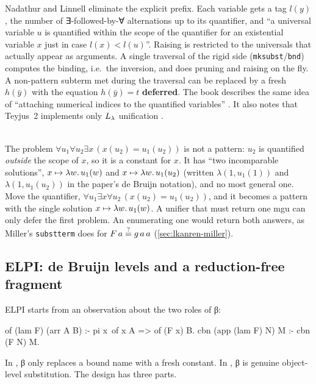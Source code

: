 Nadathur and Linnell \cite{NadathurLinnell2005} eliminate the explicit prefix. Each variable gets a
tag $l(y)$, the number of ∃-followed-by-∀ alternations up to its quantifier, and \enquote{a universal
variable $u$ is quantified within the scope of the quantifier for an existential variable $x$ just in
case $l(x)<l(u)$}. Raising is restricted to the universals that actually appear as arguments. A single
traversal of the rigid side (\texttt{mksubst}/\texttt{bnd}) computes the binding, i.e.\ the inversion,
and does pruning and raising on the fly. A non-pattern subterm met during the traversal can be replaced
by a fresh $h(\bar y)$ with the equation $h(\bar y)=t$ \textbf{deferred}. The book describes the same
idea of \enquote{attaching numerical indices to the quantified variables} . It also notes that
Teyjus~2 implements only $L_\lambda$ unification .

\begin{example}\leavevmode\\
The problem $\forall u_1\forall u_2\exists x\,(x(u_2)=u_1(u_2))$ is not a pattern: $u_2$ is quantified
\emph{outside} the scope of $x$, so it is a constant for $x$. It has \enquote{two incomparable solutions},
$x\mapsto\lambda w.\,u_1(w)$ and $x\mapsto\lambda w.\,u_1(u_2)$ (written $\lambda(1,u_1(1))$ and
$\lambda(1,u_1(u_2))$ in the paper's de Bruijn notation), and no most general one. Move the quantifier,
$\forall u_1\exists x\forall u_2\,(x(u_2)=u_1(u_2))$, and it becomes a pattern with the single solution
$x\mapsto\lambda w.\,u_1(w)$. A unifier that must return one mgu can only defer the first problem. An
enumerating one would return both answers, as Miller's \texttt{substterm} does for
$F\,a\stackrel{?}{=} g\,a\,a$ (\cref{sec:lkanren-miller}).
\end{example}

\subsection{ELPI: de Bruijn levels and a reduction-free fragment}

ELPI \cite{DunchevEtAl2015} starts from an observation about the two roles of β:

\begin{lprolog}
of (lam F) (arr A B) :- pi x\ of x A => of (F x) B.
cbn (app (lam F) N) M :- cbn (F N) M.
\end{lprolog}

\noindent In , β only replaces a bound name with a fresh constant. In , β is genuine
object-level substitution. The design has three parts.

